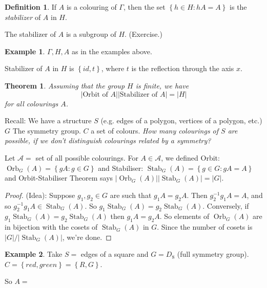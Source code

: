 \documentclass{article}
\newtheorem{theorem}{Theorem}
\theoremstyle{definition}
\newtheorem*{definition}{Definition}
\newtheorem*{exmp}{Example}
\DeclareMathOperator{\Orb}{Orb}
\DeclareMathOperator{\Stab}{Stab}
\begin{document}
 \begin{definition}
   If $A$ is a colouring of $\Gamma$, then the set $\left\{ h \in H : hA=A \right\}$ is the \emph{stabilizer} of $A$ in $H$.

   The stabilizer of $A$ is a subgroup of $H$. (Exercise.)\\

   \begin{exmp}
     $\Gamma, H, A$ as in the examples above.

     Stabilizer of $A$ in $H$ is $\left\{ id,t \right\}$, where $t$ is the reflection through the axis $x$.\\
   \end{exmp}
 \end{definition}

 \begin{theorem}
   Assuming that the group $H$ is finite, we have
  \[ 
  \big|\text{Orbit of }A\big| \big|\text{Stabilizer of } A\big|=\big|H\big| \] for all colourings $A$.
  
   \label{thm:orbitstabilizer}
 \end{theorem}

 Recall: We have a structure $S$ (e.g. edges of a polygon, vertices of a polygon, etc.) $G$ The symmetry group. $C$ a set of colours. \emph{How many colourings of $S$ are possible, if we don't distinguish colourings related by a symmetry?}

 Let $\mathcal{A}=$ set of all possible colourings. For $A \in \mathcal{A}$, we defined Orbit: $\Orb_G(A)=\left\{ gA : g \in G \right\}$ and Stabiliser: $\Stab_G(A) = \left\{ g \in G : gA = A \right\}$ and Orbit-Stabiliser Theorem says $|\Orb_G(A)||\Stab_G(A)|=|G|$.

 \begin{proof}
   (Idea): Suppose $g_1,g_2\in G$ are such that $g_1A=g_2A$. Then $g_2^{-1}g_1A=A$, and so $g_2^{-1}g_1A \in \Stab_G(A)$. So $g_1\Stab_G(A)=g_2\Stab_G(A)$. Conversely, if $g_1\Stab_G(A)=g_2\Stab_G(A)$ then $g_1A=g_2A$. So elements of $\Orb_G(A)$ are in bijection with the cosets of $\Stab_G(A)$ in $G$. Since the number of cosets is $|G|/|\Stab_G(A)|$, we're done.
 \end{proof} 

 \begin{exmp}
   Take $S=$ edges of a square and $G=D_8$ (full symmetry group). $C = \left\{ red, green \right\}=\left\{ R,G \right\}$. 
   
   So
   $A=$
   \begin{figure}[h]
     \centering 
     \label{fig:coloursquare}
   \end{figure}
 
 \end{exmp}
\end{document}
